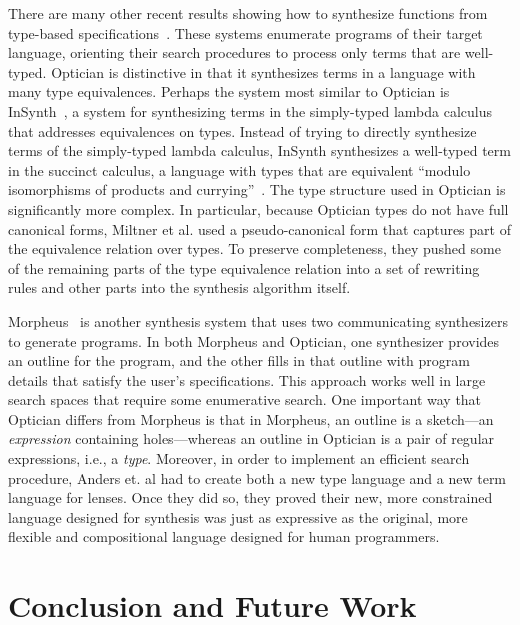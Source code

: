\documentclass[acmsmall,screen]{acmart}
\begin{document}
There are many other recent results showing how to synthesize functions from
type-based
specifications~\cite{augustsson-2004,osera+:pldi15,feser-pldi-2015,scherer-icfp-2015,frankle+:popl16,armando+:pldi16}.
These systems enumerate programs of their target language, orienting their
search procedures to process only terms that are well-typed.
Optician is distinctive in that it synthesizes terms in a language with many
type equivalences. Perhaps the system most similar to Optician is
InSynth~\cite{gvero-pldi-2013}, a system for synthesizing terms in the
simply-typed lambda calculus that addresses equivalences on types. Instead of
trying to directly synthesize terms of the simply-typed lambda calculus,
InSynth synthesizes a well-typed term in the succinct calculus, a language with
types that are equivalent ``modulo isomorphisms of products and
currying''~\cite{gvero-pldi-2013}. The type structure used in Optician
is significantly more complex.  In particular, because Optician types do not
have full canonical forms, Miltner et al. \cite{miltner2017synthesizing} used a pseudo-canonical form that
captures part of the equivalence relation over types. To preserve
completeness, they pushed some of the remaining parts of the type equivalence
relation into a set of rewriting rules and other parts into the synthesis
algorithm itself.

Morpheus~\cite{morpheus} is another synthesis system that uses two
communicating synthesizers to generate programs.  In both Morpheus and
Optician, one synthesizer provides an outline for the program, and the other
fills in that outline with program details that satisfy the user's
specifications. This approach works well in large search spaces that require
some enumerative search. One important way that Optician differs from Morpheus
is that in Morpheus, an outline is a sketch---an \emph{expression}
containing holes---whereas an outline in Optician is a pair of regular
expressions, i.e., a \emph{type}.  Moreover, in order to implement an efficient
search procedure, Anders et. al had to create both a new type language and a new
term language for lenses.  Once they did so, they proved their new, more
constrained language designed for synthesis was just as expressive as the
original, more flexible and compositional language designed for human
programmers.

\section{Conclusion and Future Work}
\label{concl}
\end{document}
